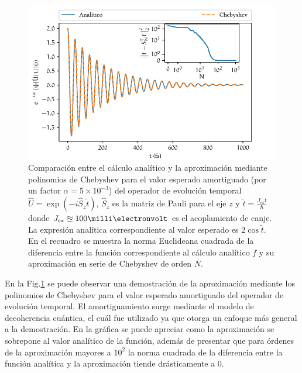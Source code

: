 \begin{figure}[htb]
	\centering
	\includegraphics{./img/comparison.pdf}
	\caption[Valor esperado para el operador de evolución temporal amortiguado]{Comparación entre el cálculo analítico y la aproximación mediante polinomios de Chebyshev para el valor esperado amortiguado (por un factor $\alpha = 5\times 10^{-3}$) del operador de evolución temporal $\hat{U} = \exp(-i \hat{S}_z \tilde{t})$, $\hat{S}_z$ es la matriz de Pauli para el eje $z$ y $\tilde{t} = \frac{J_{\mathrm{ex}}t}{\hbar}$ donde $J_{\mathrm{ex}}\approxeq 100\milli\electronvolt$ es el acoplamiento de canje. La expresión analítica correspondiente al valor esperado es $2\cos{\tilde{t}}$. En el recuadro se muestra la norma Euclideana cuadrada de la diferencia entre la función correspondiente al cálculo analítico $f$ y su aproximación en serie de Chebyshev de orden $N$.}
	\label{fig:comparison}
\end{figure}

En la Fig.\ref{fig:comparison} se puede observar una demostración de la aproximación mediante los polinomios de Chebyshev para el valor esperado amortiguado del operador de evolución temporal. El amortiguamiento surge mediante el modelo de decoherencia cuántica, el cuál fue utilizado ya que otorga un enfoque más general a la demostración. En la gráfica se puede apreciar como la aproximación se sobrepone al valor analítico de la función, además de presentar que para órdenes de la aproximación mayores a $10^2$ la norma cuadrada de la diferencia entre la función analítica y la aproximación tiende drásticamente a $0$. 